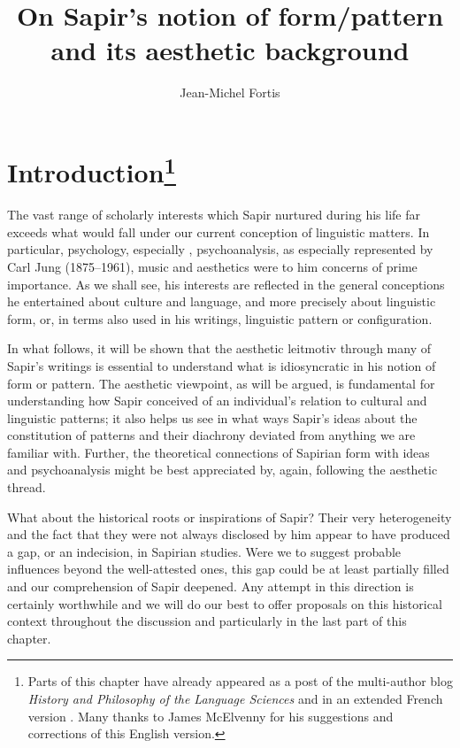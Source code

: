 \documentclass[output=paper]{langscibook}
\author{Jean-Michel Fortis\affiliation{\textsc{cnrs}, Université Paris Diderot}}
\title{On Sapir's notion of form/pattern and its aesthetic background}
\begin{document}
\maketitle

\section{Introduction\protect\footnote{Parts of this chapter have already appeared as a post of the multi-author blog \emph{History and Philosophy of the Language Sciences} \citep{Fortis2014} and in an extended French version \citep{Fortis2015}. Many thanks to James McElvenny for his suggestions and corrections of this English version. }}
\label{sec:fotis:intro}

The vast range of scholarly interests which Sapir nurtured during his life far exceeds what would fall under our current conception of linguistic matters. In particular, psychology, especially , psychoanalysis, as especially represented by Carl Jung (1875--1961), music and aesthetics were to him concerns of prime importance. As we shall see, his interests are reflected in the general conceptions he entertained about culture and language, and more precisely about linguistic form, or, in terms also used in his writings, linguistic pattern or configuration.

In what follows, it will be shown that the aesthetic leitmotiv  through many of Sapir's writings is essential to understand what is idiosyncratic in his notion of form or pattern. The aesthetic viewpoint, as will be argued, is fundamental for understanding how Sapir conceived of an individual's relation to cultural and linguistic patterns; it also helps us see in what ways Sapir's ideas about the constitution of patterns and their diachrony deviated from anything we are familiar with. Further, the theoretical connections of Sapirian form with  ideas and psychoanalysis might be best appreciated by, again, following the aesthetic thread.

What about the historical roots or inspirations of Sapir? Their very heterogeneity and the fact that they were not always disclosed by him appear to have produced a gap, or an indecision, in Sapirian studies. Were we to suggest probable influences beyond the well-attested ones, this gap could be at least partially filled and our comprehension of Sapir deepened. Any attempt in this direction is certainly worthwhile and we will do our best to offer proposals on this historical context throughout the discussion and particularly in the last part of this chapter.
\end{document}

